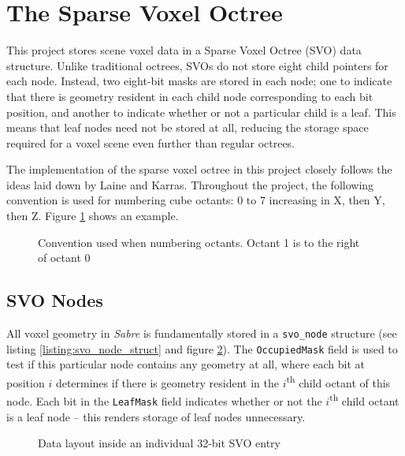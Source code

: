 \section{The Sparse Voxel Octree}
This project stores scene voxel data in a Sparse Voxel Octree (SVO) data structure. Unlike traditional octrees, SVOs do not store eight child pointers for each node. Instead, two eight-bit masks are stored in each node; one to indicate that there is geometry resident in each child node corresponding to each bit position, and another to indicate whether or not a particular child is a leaf. This means that leaf nodes need not be stored at all, reducing the storage space required for a voxel scene even further than regular octrees.

The implementation of the sparse voxel octree in this project closely follows the ideas laid down by Laine and Karras. Throughout the project, the following convention is used for numbering cube octants: 0 to 7 increasing in X, then Y, then Z. Figure \ref{fig:octants_example} shows an example.

\begin{figure}[ht]
    \centering
    \footnotesize
    
    \caption{Convention used when numbering octants. Octant 1 is to the right of octant 0}
    \label{fig:octants_example}
\end{figure}

\subsection{SVO Nodes}
All voxel geometry in \textit{Sabre} is fundamentally stored in a \texttt{svo\_node} structure (see listing \ref{listing:svo_node_struct} and figure \ref{fig:svo_entry}). The \texttt{OccupiedMask} field is used to test if this particular node contains any geometry at all, where each bit at position $i$ determines if there is geometry resident in the $i$\textsuperscript{th} child octant of this node. Each bit in the \texttt{LeafMask} field indicates whether or not the $i$\textsuperscript{th} child octant is a leaf node -- this renders storage of leaf nodes unnecessary. 

\begin{figure}[ht]
    \centering
    \footnotesize
    
    \caption{Data layout inside an individual 32-bit SVO entry}
    \label{fig:svo_entry}
\end{figure}

